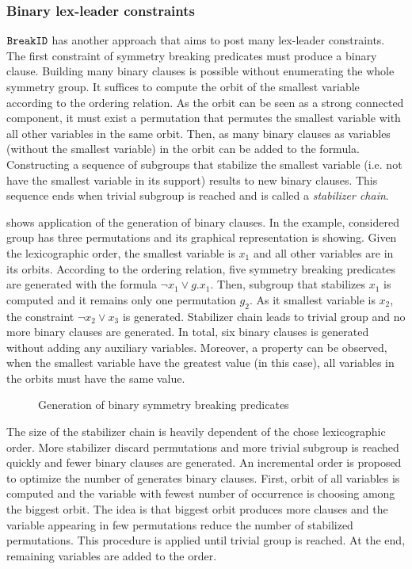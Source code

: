 \subsubsection{Binary lex-leader constraints}
$\texttt{BreakID}$ has another approach that aims to post many lex-leader constraints.
The first constraint of symmetry breaking predicates must produce a binary clause.
Building many binary clauses is possible without enumerating the whole symmetry group. 
It suffices to compute the orbit of the smallest variable according to the ordering relation. As the orbit can be seen as a strong connected component, it must exist a permutation that permutes the smallest variable with all other variables in the same orbit.
Then, as many binary clauses as variables (without the smallest variable) in the orbit can be added to the formula. Constructing a sequence of subgroups that stabilize the smallest variable (i.e. not have the smallest variable in its support) results to new binary clauses.
This sequence ends when trivial subgroup is reached and is called a  \emph{stabilizer chain}.

 shows application of the generation of binary clauses.
In the example, considered group has three permutations and its graphical representation
is showing. Given the lexicographic order, the smallest variable is $x_1$ and 
all other variables are in its orbits. According to the ordering relation, five 
symmetry breaking predicates are generated with the formula $\neg x_1 \lor g.x_1$.
Then, subgroup that stabilizes $x_1$ is computed and it remains only one permutation $g_2$.
As it smallest variable is $x_2$, the constraint $\neg x_2 \lor x_3$ is generated.
Stabilizer chain leads to trivial group and no more binary clauses are generated.
In total, six binary clauses is generated without adding any auxiliary variables.
Moreover, a property can be observed, when the smallest variable have the greatest value 
(\true in this case), all variables in the orbits must have the same value.
 \begin{figure}[!htbp]
 
 \caption{Generation of binary symmetry breaking predicates}
 \label{fig:binary_sbp}
\end{figure}

The size of the stabilizer chain is heavily dependent of the chose lexicographic order.
More stabilizer discard permutations and more trivial subgroup is reached quickly and fewer 
binary clauses are generated. An incremental order is proposed to optimize the number of generates binary clauses. First, orbit of all variables is computed and the variable with fewest number of occurrence is choosing among the biggest orbit. The idea is that biggest orbit produces more
clauses and the variable appearing in few permutations reduce the number of stabilized permutations. This procedure is applied until trivial group is reached. At the end, remaining variables are added to the order.

